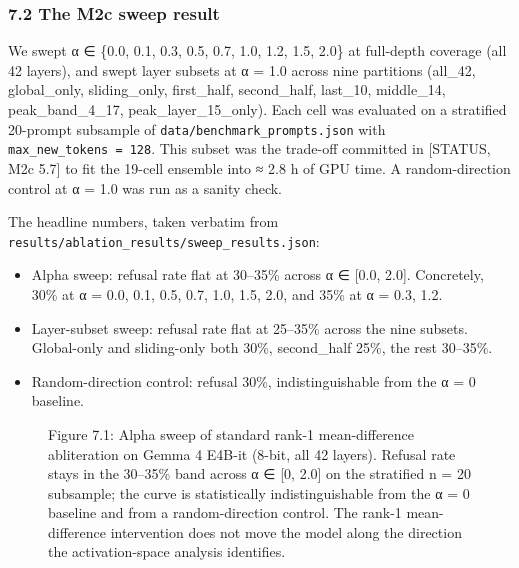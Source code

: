 \documentclass[
  11pt,
]{article}
\makeatletter
\newcommand*\pandocbounded[1]{%
  \sbox\pandoc@box{#1}%
  \Gscale@div\@tempa{\textheight}{\dimexpr\ht\pandoc@box+\dp\pandoc@box\relax}%
  \Gscale@div\@tempb{\linewidth}{\wd\pandoc@box}%
  \ifdim\@tempb\p@<\@tempa\p@\let\@tempa\@tempb\fi%
  \ifdim\@tempa\p@<\p@\scalebox{\@tempa}{\usebox\pandoc@box}%
  \else\usebox{\pandoc@box}%
  \fi%
}
\providecommand{\tightlist}{%
  \setlength{\itemsep}{0pt}\setlength{\parskip}{0pt}}
\makeatother
\begin{document}
\subsubsection{7.2 The M2c sweep result}\label{the-m2c-sweep-result}

We swept α ∈ \{0.0, 0.1, 0.3, 0.5, 0.7, 1.0, 1.2, 1.5, 2.0\} at
full-depth coverage (all 42 layers), and swept layer subsets at α = 1.0
across nine partitions (all\_42, global\_only, sliding\_only,
first\_half, second\_half, last\_10, middle\_14, peak\_band\_4\_17,
peak\_layer\_15\_only). Each cell was evaluated on a stratified
20-prompt subsample of \texttt{data/benchmark\_prompts.json} with
\texttt{max\_new\_tokens\ =\ 128}. This subset was the trade-off
committed in {[}STATUS, M2c 5.7{]} to fit the 19-cell ensemble into ≈
2.8 h of GPU time. A random-direction control at α = 1.0 was run as a
sanity check.

The headline numbers, taken verbatim from
\texttt{results/ablation\_results/sweep\_results.json}:

\begin{itemize}
\tightlist
\item
  Alpha sweep: refusal rate flat at 30--35\% across α ∈ {[}0.0, 2.0{]}.
  Concretely, 30\% at α = 0.0, 0.1, 0.5, 0.7, 1.0, 1.5, 2.0, and 35\% at
  α = 0.3, 1.2.
\item
  Layer-subset sweep: refusal rate flat at 25--35\% across the nine
  subsets. Global-only and sliding-only both 30\%, second\_half 25\%,
  the rest 30--35\%.
\item
  Random-direction control: refusal 30\%, indistinguishable from the α =
  0 baseline.
\end{itemize}

\begin{figure}
\centering
\pandocbounded{\includegraphics[keepaspectratio,alt={Figure 7.1: Alpha sweep of standard rank-1 mean-difference abliteration on Gemma 4 E4B-it (8-bit, all 42 layers). Refusal rate stays in the 30--35\% band across α ∈ {[}0, 2.0{]} on the stratified n = 20 subsample; the curve is statistically indistinguishable from the α = 0 baseline and from a random-direction control. The rank-1 mean-difference intervention does not move the model along the direction the activation-space analysis identifies.}]{../results/figures/alpha_sweep.png}}
\caption{Figure 7.1: Alpha sweep of standard rank-1 mean-difference
abliteration on Gemma 4 E4B-it (8-bit, all 42 layers). Refusal rate
stays in the 30--35\% band across α ∈ {[}0, 2.0{]} on the stratified n =
20 subsample; the curve is statistically indistinguishable from the α =
0 baseline and from a random-direction control. The rank-1
mean-difference intervention does not move the model along the direction
the activation-space analysis identifies.}
\end{figure}
\end{document}
